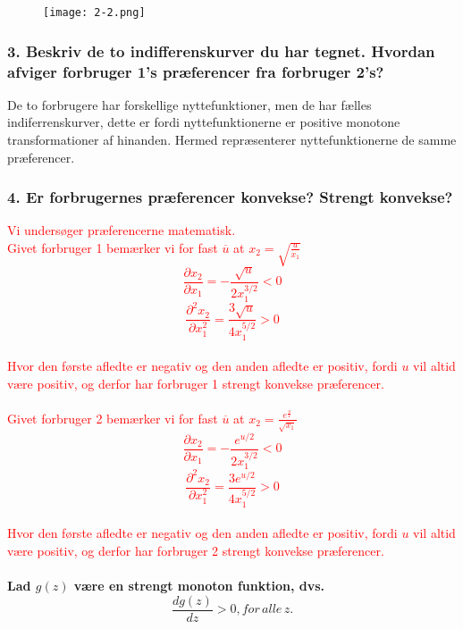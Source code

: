 \documentclass[a4paper, 12pt]{article}
\begin{document}
\FloatBarrier
\begin{center}
	\begin{figure}[!ht]	
		\centering	
\texttt{[image: 2-2.png]}
		\caption{}
	\end{figure}
\end{center}
\FloatBarrier


\subsubsection*{3. Beskriv de to indifferenskurver du har tegnet. Hvordan afviger forbruger 1's præferencer fra forbruger 2's?}
De to forbrugere har forskellige nyttefunktioner, men de har fælles indiferrenskurver, dette er fordi nyttefunktionerne er positive monotone transformationer af hinanden. Hermed repræsenterer nyttefunktionerne de samme præferencer.

\subsubsection*{4. Er forbrugernes præferencer konvekse? Strengt konvekse?}
\textcolor{red}{Vi undersøger præferencerne matematisk.}
\\
\textcolor{red}{Givet forbruger 1 bemærker vi for fast $\overline{u}$ at $x_{2} = \sqrt{\frac{u}{x_{1}}}$ }
\textcolor{red}{$$\dfrac{\partial x_{2}}{\partial x_{1}} = - \dfrac{ \sqrt{u}}{2x_{1}^{3/2}} < 0$$}
\textcolor{red}{$$\dfrac{\partial ^{2} x_{2}}{\partial x_{1}^{2}} = \dfrac{ 3\sqrt{u}}{4x_{1}^{5/2}} > 0 $$}
\\
\textcolor{red}{Hvor den første afledte er negativ og den anden afledte er positiv, fordi $u$ vil altid være positiv, og derfor har forbruger 1 strengt konvekse præferencer.}
\\\\
\textcolor{red}{Givet forbruger 2 bemærker vi for fast $\overline{u}$ at $x_{2} = \frac{e^{\frac{u}{2}}}{\sqrt{x_{1}}}$ }
\textcolor{red}{$$\dfrac{\partial x_{2}}{\partial x_{1}} = - \dfrac{ e^{u/2}}{2x_{1}^{3/2}} < 0$$}
\textcolor{red}{$$\dfrac{\partial ^{2} x_{2}}{\partial x_{1}^{2}} = \dfrac{ 3e^{u/2}}{4x_{1}^{5/2}} > 0 $$}
\\
\textcolor{red}{Hvor den første afledte er negativ og den anden afledte er positiv, fordi $u$ vil altid være positiv, og derfor har forbruger 2 strengt konvekse præferencer.}
\\\\
\textbf{Lad $g(z)$ være en strengt monoton funktion, dvs.}
$$\frac{dg(z)}{dz} > 0, for  \, alle \, z.$$
\end{document}
